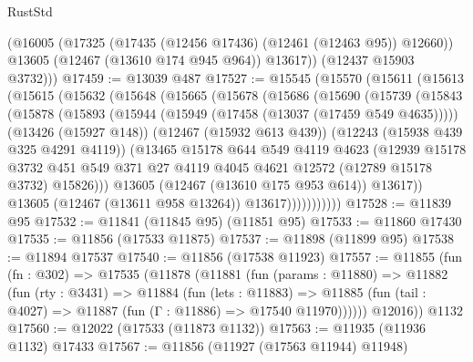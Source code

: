 \begin{lexlean}{RustStd}
\begin{coremodule}
          (@16005
            (@17325 (@17435 (@12456 @17436) (@12461 (@12463 @95)) @12660))
            @13605
            (@12467 (@13610 @174 @945 @964))
            @13617))
        (@12437 @15903 @3732)))
@17459 := @13039 @487
@17527 := @15545
    (@15570
      (@15611
        (@15613
          (@15615
            (@15632
              (@15648
                (@15665
                  (@15678
                    (@15686
                      (@15690
                        (@15739
                          (@15843
                            (@15878
                              (@15893
                                (@15944 (@15949 (@17458 (@13037 (@17459 @549 @4635)))))
                                (@13426 (@15927 @148))
                                (@12467 (@15932 @613 @439))
                                (@12243 (@15938 @439 @325 @4291 @4119))
                                (@13465
                                  @15178
                                  @644
                                  @549
                                  @4119
                                  @4623
                                  (@12939
                                    @15178
                                    @3732
                                    @451
                                    @549
                                    @371
                                    @27
                                    @4119
                                    @4045
                                    @4621
                                    @12572
                                    (@12789 @15178 @3732)
                                    @15826)))
                              @13605
                              (@12467 (@13610 @175 @953 @614))
                              @13617))
                          @13605
                          (@12467 (@13611 @958 @13264))
                          @13617)))))))))))
@17528 := @11839 @95
@17532 := @11841 (@11845 @95) (@11851 @95)
@17533 := @11860 @17430
@17535 := @11856 (@17533 @11875)
@17537 := @11898 (@11899 @95)
@17538 := @11894 @17537
@17540 := @11856 (@17538 @11923)
@17557 := @11855
    (fun (fn : @302) =>
    @17535
      (@11878
        (@11881
          (fun (params : @11880) =>
          @11882
            (fun (rty : @3431) =>
            @11884
              (fun (lets : @11883) =>
              @11885 (fun (tail : @4027) => @11887 (fun (Γ : @11886) => @17540 @11970))))))
        @12016))
    @1132
@17560 := @12022 (@17533 (@11873 @1132))
@17563 := @11935 (@11936 @1132) @17433
@17567 := @11856 (@11927 (@17563 @11944) @11948)

\end{coremodule}
\end{lexlean}
